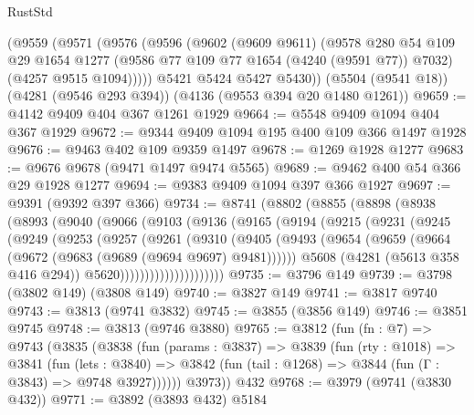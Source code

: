 \begin{lexlean}{RustStd}
\begin{coremodule}
    (@9559
      (@9571
        (@9576
          (@9596
            (@9602
              (@9609 @9611)
              (@9578
                @280
                @54
                @109
                @29
                @1654
                @1277
                (@9586 @77 @109 @77 @1654 (@4240 (@9591 @77)) @7032)
                (@4257 @9515 @1094)))))
        @5421
        @5424
        @5427
        @5430))
    (@5504 (@9541 @18))
    (@4281 (@9546 @293 @394))
    (@4136 (@9553 @394 @20 @1480 @1261))
@9659 := @4142 @9409 @404 @367 @1261 @1929
@9664 := @5548 @9409 @1094 @404 @367 @1929
@9672 := @9344 @9409 @1094 @195 @400 @109 @366 @1497 @1928
@9676 := @9463 @402 @109 @9359 @1497
@9678 := @1269 @1928 @1277
@9683 := @9676 @9678 (@9471 @1497 @9474 @5565)
@9689 := @9462 @400 @54 @366 @29 @1928 @1277
@9694 := @9383 @9409 @1094 @397 @366 @1927
@9697 := @9391 (@9392 @397 @366)
@9734 := @8741
    (@8802
      (@8855
        (@8898
          (@8938
            (@8993
              (@9040
                (@9066
                  (@9103
                    (@9136
                      (@9165
                        (@9194
                          (@9215
                            (@9231
                              (@9245
                                (@9249
                                  (@9253
                                    (@9257
                                      (@9261
                                        (@9310
                                          (@9405
                                            (@9493
                                              (@9654
                                                (@9659
                                                  (@9664
                                                    (@9672 (@9683 (@9689 (@9694 @9697) @9481))))))
                                              @5608
                                              (@4281 (@5613 @358 @416 @294))
                                              @5620)))))))))))))))))))))
@9735 := @3796 @149
@9739 := @3798 (@3802 @149) (@3808 @149)
@9740 := @3827 @149
@9741 := @3817 @9740
@9743 := @3813 (@9741 @3832)
@9745 := @3855 (@3856 @149)
@9746 := @3851 @9745
@9748 := @3813 (@9746 @3880)
@9765 := @3812
    (fun (fn : @7) =>
    @9743
      (@3835
        (@3838
          (fun (params : @3837) =>
          @3839
            (fun (rty : @1018) =>
            @3841
              (fun (lets : @3840) =>
              @3842 (fun (tail : @1268) => @3844 (fun (Γ : @3843) => @9748 @3927))))))
        @3973))
    @432
@9768 := @3979 (@9741 (@3830 @432))
@9771 := @3892 (@3893 @432) @5184

\end{coremodule}
\end{lexlean}
